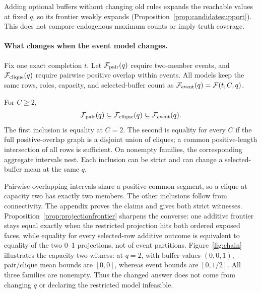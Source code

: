 Adding optional buffers without changing old rules expands the reachable
values at fixed $q$, so its frontier weakly expands
(Proposition~\ref{prop:candidatesupport}). This does not compare endogenous
maximum counts or imply truth coverage.

\paragraph{What changes when the event model changes.}
Fix one exact completion $t$. Let $\mathcal F_{\rm pair}(q)$ require two-member
events, and $\mathcal F_{\rm clique}(q)$ require pairwise positive overlap within
events. All models keep the same rows, roles, capacity, and selected-buffer
count as $\mathcal F_{\rm event}(q)=\mathcal F(t,C,q)$.

\begin{proposition}
\label{prop:modelcontainment}
For $C\ge2$,
\[
 \mathcal F_{\rm pair}(q)\subseteq\mathcal F_{\rm clique}(q)
 \subseteq\mathcal F_{\rm event}(q).
\]
The first inclusion is equality at $C=2$. The second is equality for every
$C$ if the full positive-overlap graph is a disjoint union of cliques; a
common positive-length intersection of all rows is sufficient. On nonempty
families, the corresponding aggregate intervals nest. Each inclusion can be
strict and can change a selected-buffer mean at the same $q$.
\end{proposition}
Pairwise-overlapping intervals share a positive common segment, so a clique
at capacity two has exactly two members. The other inclusions follow from
connectivity. The appendix proves the claims and gives both strict witnesses.
Proposition~\ref{prop:projectionfrontier} sharpens the converse: one additive
frontier stays equal exactly when the restricted projection hits both ordered
exposed faces, while equality for every selected-row additive outcome is
equivalent to equality of the two 0--1 projections, not of event partitions.
Figure~\ref{fig:chain} illustrates the capacity-two witness: at $q=2$, with
buffer values $(0,0,1)$, pair/clique mean bounds are $[0,0]$, whereas event
bounds are $[0,1/2]$. All three families are nonempty. Thus the changed answer
does not come from changing $q$ or declaring the restricted model infeasible.

